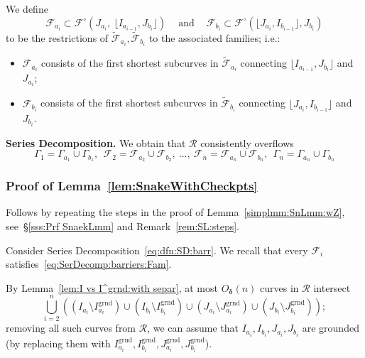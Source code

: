 \documentclass{amsart}
\renewcommand{\sp}{{\ \ }}
\newcommand{\1}{{\mathbb 1 }}
\newcommand{\Fam}{{\mathcal F}}
\newcommand\RR{\mathcal{R}}
\newcommand{\grnd}{{\operatorname{grnd}}}
\theoremstyle{remark}
\numberwithin{equation}{section}
\theoremstyle{definition}
\newcommand{\bdelta}{{\boldsymbol{ \delta}}}
\begin{document}
We define 
\begin{equation}
\label{eq:SerDecomp:barriers:Fam}
\Fam_{a_i} \subset \Fam^\circ(J_{a_i},\ \lfloor I_{a_{i-1}}, J_{b_i}\rfloor )\sp\sp\text{ and }\sp\sp \Fam_{b_i} \subset \Fam^\circ(\lfloor J_{a_i},I_{b_{i-1}} \rfloor , J_{b_i})
\end{equation} 
to be the restrictions of $\widetilde \Fam_{a_i}, \widetilde \Fam_{b_i}$ to the associated families; i.e.:
\begin{itemize}
\item $\Fam_{a_i} $ consists of the first shortest subcurves in $\widetilde \Fam_{a_i}$ connecting $\lfloor I_{a_{i-1}}, J_{b_i}\rfloor$ and $J_{a_i}$;  
\item $\Fam_{b_i} $ consists of the first shortest subcurves in $\widetilde \Fam_{b_i}$ connecting $\lfloor J_{a_i},I_{b_{i-1}} \rfloor$ and $J_{b_i}$.
\end{itemize}

{\bf Series Decomposition.} We obtain that $\RR$ consistently overflows 
\begin{equation}
\label{eq:dfn:SD:barr}
 \Gamma_{1}=\Gamma_{a_1}\cup \Gamma_{b_1},\sp \Fam_2=\Fam_{a_2}\cup \Fam_{b_2}, \  \dots,\  \Fam_{n}=\Fam_{a_n}\cup \Fam_{b_n}, \sp\Gamma_{n}=\Gamma_{a_n}\cup \Gamma_{b_n}
\end{equation}


\subsubsection{Proof of Lemma~\ref{lem:SnakeWithCheckpts}} Follows by repeating the steps in the proof of Lemma~\ref{simplmm:SnLmm:wZ}, see~\S\ref{sss:Prf SnaekLmm} and Remark~\ref{rem:SL:steps}. 

Consider Series Decomposition~\ref{eq:dfn:SD:barr}. We recall that every $\Fam_i$ satisfies~\eqref{eq:SerDecomp:barriers:Fam}.


By Lemma~\ref{lem:I vs I^grnd:with separ}, at most $O_\bdelta(n)$ curves in $\RR$ intersect \[\bigcup_{i=2}^n \left(\left(I_{a_i}\setminus I^\grnd_{a_i}\right)\cup \left(I_{b_i}\setminus I^\grnd_{b_i}\right)\cup\left(J_{a_i}\setminus J^\grnd_{a_i}\right)\cup \left(J_{b_i}\setminus J^\grnd_{b_i}\right) \right);\]
removing all such curves from $\RR$, we can assume that $I_{a_i}, I_{b_i}, J_{a_i}, J_{b_i}$ are grounded (by replacing them with $I^\grnd_{a_i}, I^\grnd_{b_i}, J^\grnd_{a_i}, J^\grnd_{b_i}$).
\end{document}
